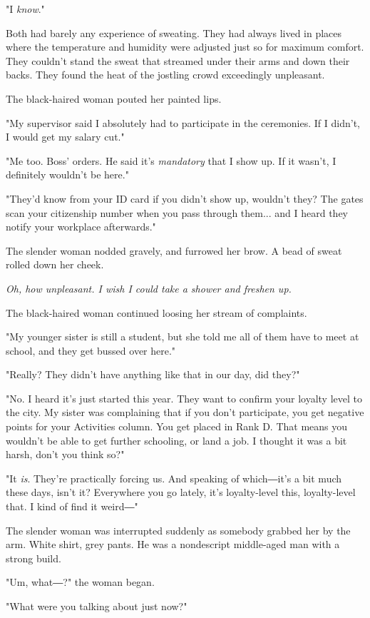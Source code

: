 "I \emph{know}."

Both had barely any experience of sweating. They had always lived in
places where the temperature and humidity were adjusted just so for
maximum comfort. They couldn't stand the sweat that streamed under their
arms and down their backs. They found the heat of the jostling crowd
exceedingly unpleasant.

The black-haired woman pouted her painted lips.

"My supervisor said I absolutely had to participate in the ceremonies.
If I didn't, I would get my salary cut."

"Me too. Boss' orders. He said it's \emph{mandatory} that I show up. If it
wasn't, I definitely wouldn't be here."

"They'd know from your ID card if you didn't show up, wouldn't they? The
gates scan your citizenship number when you pass through them... and I
heard they notify your workplace afterwards."

The slender woman nodded gravely, and furrowed her brow. A bead of sweat
rolled down her cheek.

\emph{Oh, how unpleasant. I wish I could take a shower and freshen up.}

The black-haired woman continued loosing her stream of complaints.

"My younger sister is still a student, but she told me all of them have
to meet at school, and they get bussed over here."

"Really? They didn't have anything like that in our day, did they?"

"No. I heard it's just started this year. They want to confirm your
loyalty level to the city. My sister was complaining that if you don't
participate, you get negative points for your Activities column. You get
placed in Rank D. That means you wouldn't be able to get further
schooling, or land a job. I thought it was a bit harsh, don't you think
so?"

"It \emph{is}. They're practically forcing us. And speaking of which―it's a bit
much these days, isn't it? Everywhere you go lately, it's loyalty-level
this, loyalty-level that. I kind of find it weird―"

The slender woman was interrupted suddenly as somebody grabbed her by
the arm. White shirt, grey pants. He was a nondescript middle-aged man
with a strong build.

"Um, what―?" the woman began.

"What were you talking about just now?"

